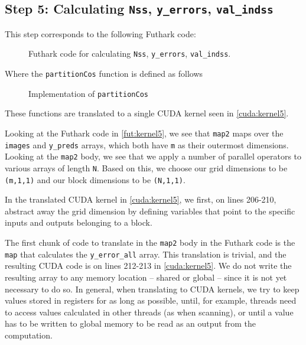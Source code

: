 \newpage
\subsection{
  Step 5: Calculating \texttt{Nss}, \texttt{y\_errors}, \texttt{val\_indss}
}
This step corresponds to the following Futhark code:
\begin{figure}[H]
    \centering
    \caption{Futhark code for calculating \texttt{Nss}, \texttt{y\_errors}, \texttt{val\_indss}.}
    \label{fut:kernel5}
\end{figure}

Where the \texttt{partitionCos} function is defined as follows
\begin{figure}[H]
    \centering
    \caption{Implementation of \texttt{partitionCos}}
    \label{fut:partitionCos}
\end{figure}
These functions are translated to a single CUDA kernel seen in
\autoref{cuda:kernel5}.

Looking at the Futhark code in \autoref{fut:kernel5}, we see that \texttt{map2}
maps over the \texttt{images} and \texttt{y\_preds} arrays, which both have
\texttt{m} as their outermost dimensions.
Looking at the \texttt{map2} body, we see that we apply a number of parallel
operators to various arrays of length \texttt{N}.
Based on this, we choose our grid dimensions to be \texttt{(m,1,1)} and our
block dimensions to be \texttt{(N,1,1)}.

In the translated CUDA kernel in \autoref{cuda:kernel5}, we first, on lines
206-210, abstract away the grid dimension by defining variables that point to
the specific inputs and outputs belonging to a block. %

The first chunk of code to translate in the \texttt{map2} body in the Futhark
code is the \texttt{map} that calculates the \texttt{y\_error\_all} array.
This translation is trivial, and the resulting CUDA code is on lines 212-213 in
\autoref{cuda:kernel5}. %
We do not write the resulting array to any memory location -- shared or global
-- since it is not yet necessary to do so.
In general, when translating to CUDA kernels, we try to keep values stored in
registers for as long as possible, until, for example, threads need to access
values calculated in other threads (as when scanning), or until a value has to
be written to global memory to be read as an output from the computation.

